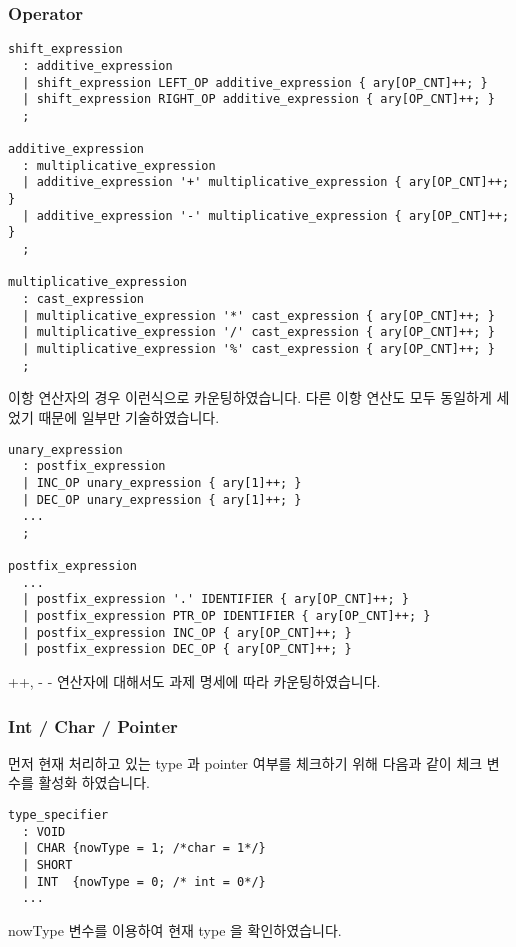 \documentclass{article}
\begin{document}
\subsubsection{Operator}
\begin{verbatim}
shift_expression
  : additive_expression
  | shift_expression LEFT_OP additive_expression { ary[OP_CNT]++; }
  | shift_expression RIGHT_OP additive_expression { ary[OP_CNT]++; }
  ;

additive_expression
  : multiplicative_expression
  | additive_expression '+' multiplicative_expression { ary[OP_CNT]++; }
  | additive_expression '-' multiplicative_expression { ary[OP_CNT]++; }
  ;

multiplicative_expression
  : cast_expression
  | multiplicative_expression '*' cast_expression { ary[OP_CNT]++; }
  | multiplicative_expression '/' cast_expression { ary[OP_CNT]++; }
  | multiplicative_expression '%' cast_expression { ary[OP_CNT]++; }
  ;
\end{verbatim}
이항 연산자의 경우 이런식으로 카운팅하였습니다. 다른 이항 연산도 모두 동일하게 세었기 때문에 일부만 기술하였습니다.
\begin{verbatim}
unary_expression
  : postfix_expression
  | INC_OP unary_expression { ary[1]++; }
  | DEC_OP unary_expression { ary[1]++; }
  ...
  ;

postfix_expression
  ...
  | postfix_expression '.' IDENTIFIER { ary[OP_CNT]++; }
  | postfix_expression PTR_OP IDENTIFIER { ary[OP_CNT]++; }
  | postfix_expression INC_OP { ary[OP_CNT]++; }
  | postfix_expression DEC_OP { ary[OP_CNT]++; }
\end{verbatim}
++, - - 연산자에 대해서도 과제 명세에 따라 카운팅하였습니다.

\subsubsection{Int / Char / Pointer}
\quad 먼저 현재 처리하고 있는 type 과 pointer 여부를 체크하기 위해 다음과 같이 체크 변수를 활성화 하였습니다.
\begin{verbatim}
type_specifier
  : VOID
  | CHAR {nowType = 1; /*char = 1*/}
  | SHORT
  | INT  {nowType = 0; /* int = 0*/}
  ...
\end{verbatim}
nowType 변수를 이용하여 현재 type 을 확인하였습니다.
\end{document}
